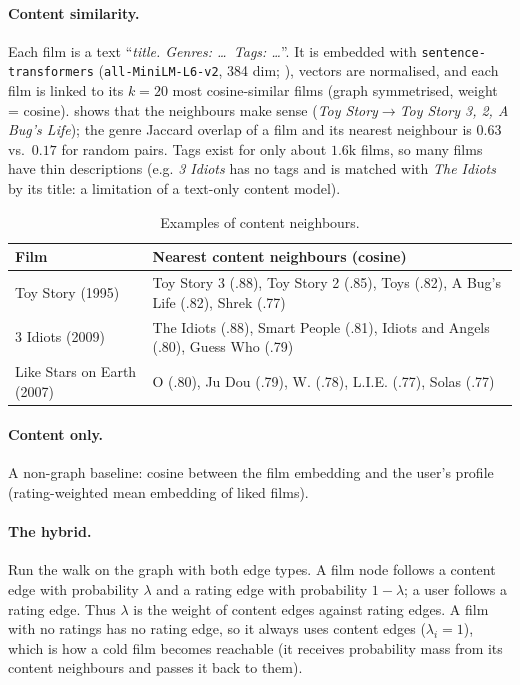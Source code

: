 \documentclass[11pt,a4paper]{article}
\begin{document}
\paragraph{Content similarity.} Each film is a text ``\emph{title. Genres: \dots\ Tags: \dots}''. It is embedded with \texttt{sentence-transformers} (\texttt{all-MiniLM-L6-v2}, 384 dim; \citealt{reimers2019}), vectors are normalised, and each film is linked to its $k=20$ most cosine-similar films (graph symmetrised, weight = cosine).  shows that the neighbours make sense (\emph{Toy Story}$\to$\emph{Toy Story 3, 2, A Bug's Life}); the genre Jaccard overlap of a film and its nearest neighbour is $0.63$ vs.\ $0.17$ for random pairs. Tags exist for only about $1.6$k films, so many films have thin descriptions (e.g. \emph{3 Idiots} has no tags and is matched with \emph{The Idiots} by its title: a limitation of a text-only content model).

\begin{table}[H]\centering\small
\begin{tabular}{ll}\toprule
Film & Nearest content neighbours (cosine)\\\midrule
Toy Story (1995) & Toy Story 3 (.88), Toy Story 2 (.85), Toys (.82), A Bug's Life (.82), Shrek (.77)\\
3 Idiots (2009) & The Idiots (.88), Smart People (.81), Idiots and Angels (.80), Guess Who (.79)\\
Like Stars on Earth (2007) & O (.80), Ju Dou (.79), W. (.78), L.I.E. (.77), Solas (.77)\\\bottomrule
\end{tabular}\caption{Examples of content neighbours.}\label{tab:nn}\end{table}

\paragraph{Content only.} A non-graph baseline: cosine between the film embedding and the user's profile (rating-weighted mean embedding of liked films).

\paragraph{The hybrid.} Run the walk on the graph with both edge types. A film node follows a content edge with probability $\lambda$ and a rating edge with probability $1-\lambda$; a user follows a rating edge. Thus $\lambda$ is the weight of content edges against rating edges. A film with no ratings has no rating edge, so it always uses content edges ($\lambda_i=1$), which is how a cold film becomes reachable (it receives probability mass from its content neighbours and passes it back to them).
\end{document}
